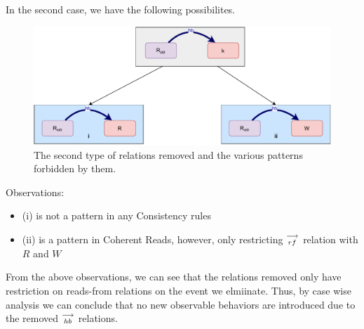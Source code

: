         In the second case, we have the following possibilites.
        \begin{figure}[H]
            \centering
            \includegraphics[scale=0.5]{Elimination/ReadElimProof/ProofParts/Part4_Case2.pdf}
            \caption{The second type of relations removed and the various patterns forbidden by them.}
        \end{figure}

        Observations:
        \begin{itemize}
            \item (i) is not a pattern in any Consistency rules
            \item (ii) is a pattern in Coherent Reads, however, only restricting $\stackrel{\longrightarrow}{_{rf}}$ relation with $R$ and $W$
        \end{itemize}

        From the above observations, we can see that the relations removed only have restriction on reads-from relations on the event we elmiinate. Thus, by case wise analysis we can conclude that no new observable behaviors are introduced due to the removed $\stackrel{\longrightarrow}{_{hb}}$ relations. 